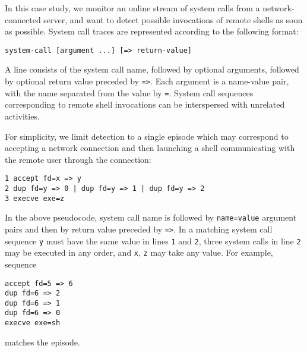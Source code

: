 \documentclass[runningheads,a4paper]{llncs}
\begin{document}
In this case study, we monitor an online stream of system calls 
from a network-connected server, and want to detect possible
invocations of remote shells as soon as possible.
System call traces are represented according to the following format:
\begin{verbatim}
system-call [argument ...] [=> return-value]
\end{verbatim}
A line consists of the system call name, followed by optional
arguments, followed by optional return value preceded by
\texttt{=>}.  Each argument is a name-value pair, with the name
separated from the value by \texttt{=}.  System call sequences
corresponding to remote shell invocations can be interspersed
with unrelated activities.

For simplicity, we limit detection to a single episode which may
correspond to accepting a network connection and then launching
a shell communicating with the remote user through the connection:
\begin{verbatim}
1 accept fd=x => y
2 dup fd=y => 0 | dup fd=y => 1 | dup fd=y => 2
3 execve exe=z
\end{verbatim}
In the above pseudocode, system call name is followed by
\texttt{name=value} argument pairs and then by return value
preceded by \texttt{=>}.  In a matching system call sequence
\texttt{y} must have the same value in lines \texttt{1} and
\texttt{2}, three system calls in line \texttt{2} may be
executed in any order, and \texttt{x}, \texttt{z} may take any
value.  For example, sequence
\begin{verbatim}
accept fd=5 => 6
dup fd=6 => 2
dup fd=6 => 1
dup fd=6 => 0
execve exe=sh
\end{verbatim}
matches the episode.
\end{document}
